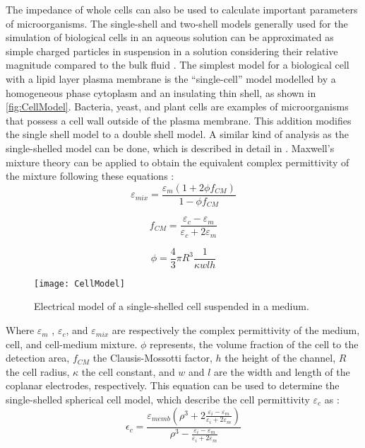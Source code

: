 The impedance of whole cells can also be used to calculate important parameters of microorganisms. The single-shell and two-shell models generally used for the simulation of biological cells in an aqueous solution can be approximated as simple charged particles in suspension in a solution considering their relative magnitude compared to the bulk fluid \cite{Xu2016}. The simplest model for a biological cell with a lipid layer plasma membrane is the “single-cell” model \cite{asami2002characterization,Gawad2004,morgan2006single,Sun2010,Xu2016} modelled by a homogeneous phase cytoplasm and an insulating thin shell, as shown in \autoref{fig:CellModel}. Bacteria, yeast, and plant cells are examples of microorganisms that possess a cell wall outside of the plasma membrane. This addition modifies the single shell model to a double shell model. A similar kind of analysis as the single-shelled model can be done, which is described in detail in \citep{asami2002characterization} \cite{Xu2016}. Maxwell’s mixture theory can be applied to obtain the equivalent complex permittivity of the mixture following these equations \cite{Xu2016,morgan2006single}:
\begin{equation}
   \varepsilon_{mix} = \frac{\varepsilon_m (1+2\phi f_{CM})}{1-\phi f_{CM}}
\end{equation}

\begin{equation}
   f_{CM} = \frac{\varepsilon_c - \varepsilon_m}{\varepsilon_c + 2\varepsilon_m}
\end{equation}

\begin{equation}
   \phi = \frac{4}{3} \pi R^3 \frac{1}{\kappa w l h}
\end{equation}
\begin{figure}[h]
    \centering
    \texttt{[image: CellModel]}
    \caption{Electrical model of a single-shelled cell suspended in a medium. \citep{simscale_2021}}
    \label{fig:CellModel}
\end{figure}
Where $\varepsilon_m$ , $\varepsilon_c$, and $\varepsilon_{mix}$ are respectively the complex permittivity of the medium, cell, and cell-medium mixture. $\phi$ represents, the volume fraction of the cell to the detection area, $f_{CM}$ the Clausis-Mossotti factor, $h$ the height of the channel, $R$ the cell radius, $\kappa$ the cell constant, and $w$ and $l$ are the width and length of the coplanar electrodes, respectively. This equation can be used to determine the single-shelled spherical cell model, which describe the cell permittivity \cite{Xu2016,morgan2006single} $\varepsilon_c$ as :
\begin{equation}
\epsilon_c = \frac{\varepsilon_{memb} (\rho ^3 + 2 \frac{\varepsilon_i-\varepsilon_m}{\varepsilon_i+2\varepsilon_m})}{\rho ^3- \frac{\varepsilon_i-\varepsilon_m}{\varepsilon_i+2\varepsilon_m}}
\end{equation}

